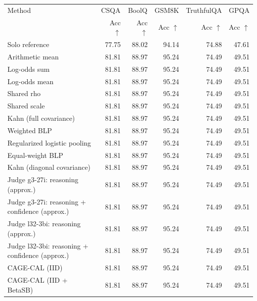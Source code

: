 \begin{tabular}{lrrrrr}
\toprule
Method & \multicolumn{1}{c}{CSQA} & \multicolumn{1}{c}{BoolQ} & \multicolumn{1}{c}{GSM8K} & \multicolumn{1}{c}{TruthfulQA} & \multicolumn{1}{c}{GPQA} \\
 & Acc $\uparrow$ & Acc $\uparrow$ & Acc $\uparrow$ & Acc $\uparrow$ & Acc $\uparrow$ \\
\midrule
Solo reference & 77.75 & 88.02 & 94.14 & 74.88 & 47.61 \\
Arithmetic mean & 81.81 & 88.97 & 95.24 & 74.49 & 49.51 \\
Log-odds sum & 81.81 & 88.97 & 95.24 & 74.49 & 49.51 \\
Log-odds mean & 81.81 & 88.97 & 95.24 & 74.49 & 49.51 \\
Shared rho & 81.81 & 88.97 & 95.24 & 74.49 & 49.51 \\
Shared scale & 81.81 & 88.97 & 95.24 & 74.49 & 49.51 \\
Kahn (full covariance) & 81.81 & 88.97 & 95.24 & 74.49 & 49.51 \\
Weighted BLP & 81.81 & 88.97 & 95.24 & 74.49 & 49.51 \\
Regularized logistic pooling & 81.81 & 88.97 & 95.24 & 74.49 & 49.51 \\
Equal-weight BLP & 81.81 & 88.97 & 95.24 & 74.49 & 49.51 \\
Kahn (diagonal covariance) & 81.81 & 88.97 & 95.24 & 74.49 & 49.51 \\
Judge g3-27i: reasoning (approx.) & 81.81 & 88.97 & 95.24 & 74.49 & 49.51 \\
Judge g3-27i: reasoning + confidence (approx.) & 81.81 & 88.97 & 95.24 & 74.49 & 49.51 \\
Judge l32-3bi: reasoning (approx.) & 81.81 & 88.97 & 95.24 & 74.49 & 49.51 \\
Judge l32-3bi: reasoning + confidence (approx.) & 81.81 & 88.97 & 95.24 & 74.49 & 49.51 \\
CAGE-CAL (IID) & 81.81 & 88.97 & 95.24 & 74.49 & 49.51 \\
CAGE-CAL (IID + BetaSB) & 81.81 & 88.97 & 95.24 & 74.49 & 49.51 \\
\bottomrule
\end{tabular}
